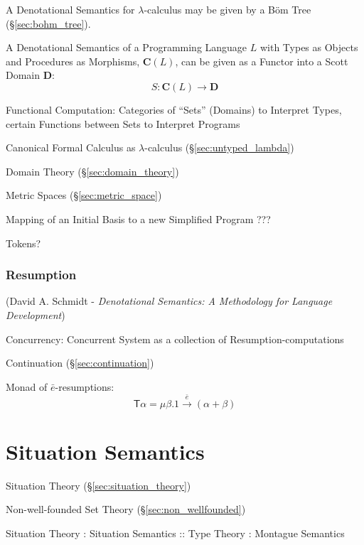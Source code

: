 A Denotational Semantics for $\lambda$-calculus may be given by a
B\"om Tree (\S\ref{sec:bohm_tree}).

A Denotational Semantics of a Programming Language $L$ with Types as
Objects and Procedures as Morphisms, $\mathbf{C}(L)$, can be given as
a Functor into a Scott Domain $\mathbf{D}$: \cite{awodey06}
\[
  S : \mathbf{C}(L) \rightarrow \mathbf{D}
\]

Functional Computation: Categories of ``Sets'' (Domains) to Interpret
Types, certain Functions between Sets to Interpret Programs

Canonical Formal Calculus as $\lambda$-calculus
(\S\ref{sec:untyped_lambda})

Domain Theory (\S\ref{sec:domain_theory})

Metric Spaces (\S\ref{sec:metric_space})

Mapping of an Initial Basis to a new Simplified Program ??? %

Tokens?



\subsubsection{Resumption}\label{sec:resumption}

(David A. Schmidt - \emph{Denotational Semantics: A Methodology for
  Language Development}) %

Concurrency: Concurrent System as a collection of
Resumption-computations \cite{filinski99}

Continuation (\S\ref{sec:continuation})

Monad of $\bar{e}$-resumptions: \cite{filinski99} %
\[
  \mathsf{T}\alpha = \mu \beta. 1 \xrightarrow{\bar{e}} (\alpha + \beta)
\]



\section{Situation Semantics}\label{sec:situation_semantics}

Situation Theory (\S\ref{sec:situation_theory})

Non-well-founded Set Theory (\S\ref{sec:non_wellfounded})

Situation Theory : Situation Semantics
  :: Type Theory : Montague Semantics



